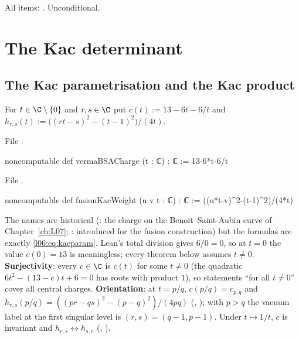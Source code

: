 \begin{status}
All items: \lean{[propext, Classical.}\allowbreak{}\allowbreak\lean{sound]}. Unconditional.
\end{status}

\section{The Kac determinant}\label{l06:sec:kac}

\subsection{The Kac parametrisation and the Kac product}

\begin{definition}\label{l06:def:kacparam}
For $t\in\C\setminus\{0\}$ and $r,s\in\C$ put $c(t) := 13-6t-6/t$ and
$h_{r,s}(t) := \bigl((rt-s)^2-(t-1)^2\bigr)/(4t)$.
\end{definition}

File .
\begin{leancode}
noncomputable def vermaBSACharge (t : ℂ) : ℂ := 13-6*t-6/t
\end{leancode}
File .
\begin{leancode}
noncomputable def fusionKacWeight (u v t : ℂ) : ℂ :=
  ((u*t-v)^2-(t-1)^2)/(4*t)
\end{leancode}

\begin{dictionary}
The names are historical (: the charge on the Benoit--Saint-Aubin curve of
Chapter~\ref{ch:L07}; : introduced for the fusion construction) but the formulas are
exactly \eqref{l06:eq:kacparam}. Lean's total division gives $6/0 = 0$, so at $t = 0$ the value $c(0) = 13$
is meaningless; every theorem below assumes $t\ne0$. \textbf{Surjectivity}: every $c\in\C$ is $c(t)$ for
some $t\ne0$ (the quadratic $6t^2-(13-c)t+6 = 0$ has roots with product $1$), so statements ``for all
$t\ne0$'' cover all central charges. \textbf{Orientation}: at $t = p/q$, $c(p/q) = c_{p,q}$ and
$h_{r,s}(p/q) = ((pr-qs)^2-(p-q)^2)/(4pq)$ (\allowbreak{},
); with $p>q$ the vacuum label at the first singular level is $(r,s) = (q-1,p-1)$.
Under $t\mapsto1/t$, $c$ is invariant and $h_{r,s}\leftrightarrow h_{s,r}$ (,
\allowbreak{}\allowbreak{}).
\end{dictionary}

